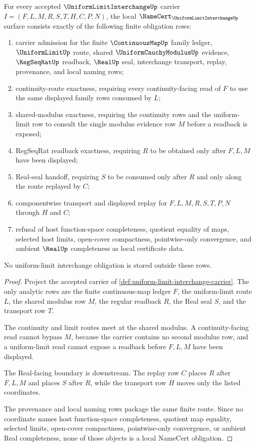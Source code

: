 \begin{theorem}
\label{thm:uniform-limit-interchange-namecert-obligations}
For every accepted $\UniformLimitInterchangeUp$ carrier $I=(F,L,M,R,S,T,H,C,P,N)$, the local $\NameCert_{\UniformLimitInterchangeUp}$ surface consists exactly of the following finite obligation rows:
\begin{enumerate}
\item carrier admission for the finite $\ContinuousMapUp$ family ledger, $\UniformLimitUp$ route, shared $\UniformCauchyModulusUp$ evidence, $\RegSeqRatUp$ readback, $\RealUp$ seal, interchange transport, replay, provenance, and local naming rows;
\item continuity-route exactness, requiring every continuity-facing read of $F$ to use the same displayed family rows consumed by $L$;
\item shared-modulus exactness, requiring the continuity rows and the uniform-limit row to consult the single modulus evidence row $M$ before a readback is exposed;
\item RegSeqRat readback exactness, requiring $R$ to be obtained only after $F,L,M$ have been displayed;
\item Real-seal handoff, requiring $S$ to be consumed only after $R$ and only along the route replayed by $C$;
\item componentwise transport and displayed replay for $F,L,M,R,S,T,P,N$ through $H$ and $C$;
\item refusal of host function-space completeness, quotient equality of maps, selected host limits, open-cover compactness, pointwise-only convergence, and ambient $\RealUp$ completeness as local certificate data.
\end{enumerate}
No uniform-limit interchange obligation is stored outside these rows.
\end{theorem}
\begin{proof}
Project the accepted carrier of \autoref{def:uniform-limit-interchange-carrier}. The only analytic rows are the finite continuous-map ledger $F$, the uniform-limit route $L$, the shared modulus row $M$, the regular readback $R$, the Real seal $S$, and the transport row $T$.

The continuity and limit routes meet at the shared modulus. A continuity-facing read cannot bypass $M$, because the carrier contains no second modulus row, and a uniform-limit read cannot expose a readback before $F,L,M$ have been displayed.

The Real-facing boundary is downstream. The replay row $C$ places $R$ after $F,L,M$ and places $S$ after $R$, while the transport row $H$ moves only the listed coordinates.

The provenance and local naming rows package the same finite route. Since no coordinate names host function-space completeness, quotient map equality, selected limits, open-cover compactness, pointwise-only convergence, or ambient Real completeness, none of those objects is a local NameCert obligation.
\end{proof}

